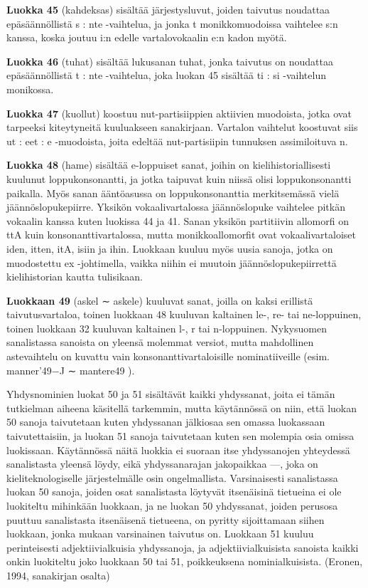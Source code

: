 \documentclass[free]{flammie}
\begin{document}
\textbf{Luokka 45} (kahdeksas) sisältää järjestysluvut, joiden taivutus noudattaa epäsäännöllistä s : nte -vaihtelua, ja jonka t monikkomuodoissa vaihtelee s:n kanssa, koska
joutuu i:n edelle vartalovokaalin e:n kadon myötä.

\textbf{Luokka 46} (tuhat) sisältää lukusanan tuhat, jonka taivutus on noudattaa epäsäännöllistä t : nte -vaihtelua, joka luokan 45 sisältää ti : si -vaihtelun monikossa.

\textbf{Luokka 47} (kuollut) koostuu nut-partisiippien aktiivien muodoista, jotka ovat tarpeeksi kiteytyneitä kuuluakseen sanakirjaan. Vartalon vaihtelut koostuvat siis ut :
eet : e -muodoista, joita edeltää nut-partisiipin tunnuksen assimiloituva n.

\textbf{Luokka 48} (hame) sisältää e-loppuiset sanat, joihin on kielihistoriallisesti kuulunut loppukonsonantti, ja jotka taipuvat kuin niissä olisi loppukonsonantti paikalla. Myös sanan ääntöasussa on loppukonsonanttia merkitsemässä vielä jäännöslopukepiirre. Yksikön vokaalivartalossa jäännöslopuke vaihtelee pitkän vokaalin
kanssa kuten luokissa 44 ja 41. Sanan yksikön partitiivin allomorfi on ttA kuin
konsonanttivartalossa, mutta monikkoallomorfit ovat vokaalivartaloiset iden, itten, itA, isiin ja ihin. Luokkaan kuuluu myös uusia sanoja, jotka on muodostettu
ex -johtimella, vaikka niihin ei muutoin jäännöslopukepiirrettä kielihistorian kautta tulisikaan.

\textbf{Luokkaan 49} (askel ∼ askele) kuuluvat sanat, joilla on kaksi erillistä taivutusvartaloa, toinen luokkaan 48 kuuluvan kaltainen le-, re- tai ne-loppuinen, toinen
luokkaan 32 kuuluvan kaltainen l-, r tai n-loppuinen. Nykysuomen sanalistassa
sanoista on yleensä molemmat versiot, mutta mahdollinen astevaihtelu on kuvattu
vain konsonanttivartaloisille nominatiiveille (esim. manner’49−J ∼ mantere49 ).

Yhdysnominien luokat 50 ja 51 sisältävät kaikki yhdyssanat, joita ei tämän tutkielman aiheena käsitellä tarkemmin, mutta käytännössä on niin, että luokan 50
sanoja taivutetaan kuten yhdyssanan jälkiosaa sen omassa luokassaan taivutettaisiin, ja luokan 51 sanoja taivutetaan kuten sen molempia osia omissa luokissaan. Käytännössä näitä luokkia ei suoraan itse yhdyssanojen yhteydessä sanalistasta yleensä löydy, eikä yhdyssanarajan jakopaikkaa —, joka on kieliteknologiselle järjestelmälle osin ongelmallista. Varsinaisesti sanalistassa luokan 50 sanoja,
joiden osat sanalistasta löytyvät itsenäisinä tietueina ei ole luokiteltu mihinkään
luokkaan, ja ne luokan 50 yhdyssanat, joiden perusosa puuttuu sanalistasta itsenäisenä tietueena, on pyritty sijoittamaan siihen luokkaan, jonka mukaan varsinainen taivutus on. Luokkaan 51 kuuluu perinteisesti adjektiivialkuisia yhdyssanoja,
ja adjektiivialkuisista sanoista kaikki onkin luokiteltu joko luokkaan 50 tai 51,
poikkeuksena nominialkuisista. (Eronen, 1994, sanakirjan osalta)
\end{document}
